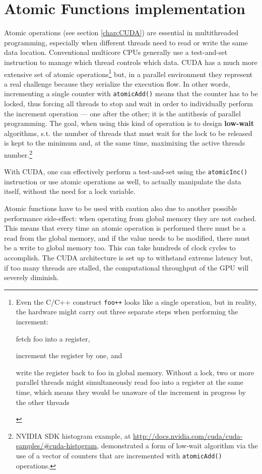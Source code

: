 \section{Atomic Functions implementation}\label{sect:atomicImplementation}
Atomic operations\cite{NvidiaprogGuide} (see section \ref{chap:CUDA}) are
essential in multithreaded programming, especially when different threads need
to read or write the same data location. Conventional multicore CPUs generally
use a test-and-set instruction to manage which thread controls which data. CUDA
has a much more extensive set of atomic operations\footnote{Even the C/C++
construct \texttt{foo++} looks like a single operation, but in reality, the
hardware might carry out three separate steps when performing the increment:
 \begin{inparaenum}
\item fetch foo into a register, 
\item increment the register by one, and
\item write the register back to foo in global memory. Without a lock, two or more parallel threads might
simultaneously read foo into a register at the same time, which means they would
be unaware of the increment in progress by the other threads
\end{inparaenum}} but, in a parallel environment they represent a real
challenge because they serialize the execution flow.
In other words, incrementing a single counter with \texttt{atomicAdd()} means
that the counter has to be locked, thus forcing all threads to stop and wait in
order to individually perform the increment operation — one after the other; it
is the antithesis of parallel programming. The goal, when using this kind of
operation is to design \textbf{low-wait} algorithms, s.t. the number of threads
that must wait for the lock to be released is kept to the minimum and, at the
same time, maximixing the active threads number.\footnote{NVIDIA SDK
histogram example\cite{NvidiaprogGuide}, at \url{http://docs.nvidia.com/cuda/cuda-samples/#cuda-histogram}, demonstrated a
form of low-wait algorithm via the use of a vector of counters that are
incremented with \texttt{atomicAdd()} operations.}


With CUDA, one can effectively perform a test-and-set using the
\texttt{atomicInc()} instruction or use atomic operations as well, to actually
manipulate the data itself, without the need for a lock variable.
 
Atomic functions have to be used with caution also due to another possible
 performance side-effect:
when operating from global memory they are not cached.
This means that every time an atomic operation is performed there must be a
read from the global memory, and if the value needs to be modified, there must
be a write to global memory too. This can take hundreds of clock cycles to
accomplish.
The CUDA architecture is set up to withstand extreme latency but, if too
many threads are stalled, the computational throughput of the GPU will severely
diminish.

